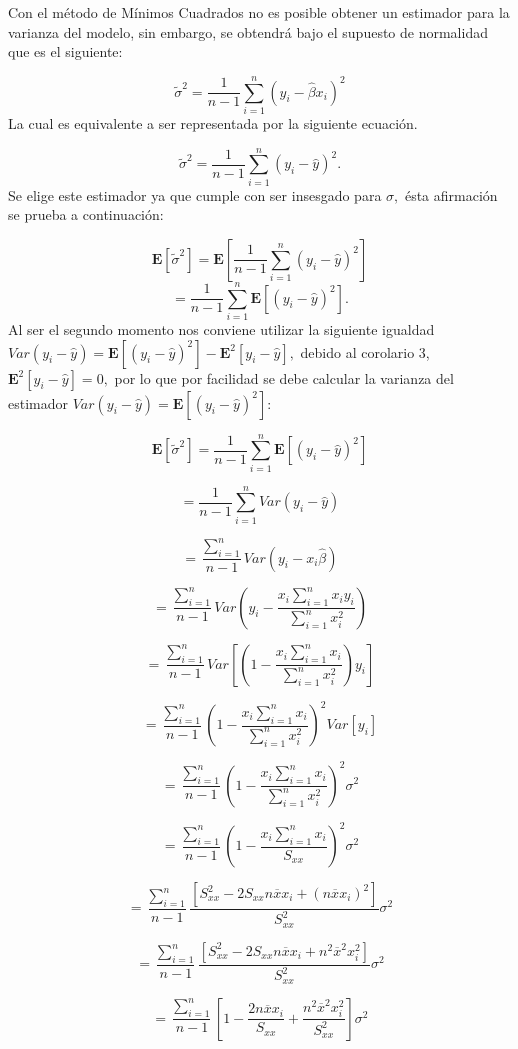 \documentclass[a4paper,oneside,openany]{book}
\begin{document}
Con el método de Mínimos Cuadrados no es posible obtener un estimador
para la varianza del modelo, sin embargo, se obtendrá bajo el supuesto
de normalidad que es el siguiente:

\[\tilde{\sigma}^2=\frac{1}{n-1}\sum_{i=1}^{n}\left(y_{i}-\hat{\beta}x_{i}\right)^2\]
La cual es equivalente a ser representada por la siguiente ecuación.

\[\tilde{\sigma}^2=\frac{1}{n-1}\sum_{i=1}^{n}(y_{i}-\hat{y})^2.\] Se
elige este estimador ya que cumple con ser insesgado para \(\sigma,\)
ésta afirmación se prueba a continuación:

\[\mathbf{E}[\tilde{\sigma}^2]=\mathbf{E}\left[\frac{1}{n-1}\sum_{i=1}^{n}(y_{i}-\hat{y})^2\right]\]
\[=\frac{1}{n-1}\sum_{i=1}^{n}\mathbf{E}\left[(y_{i}-\hat{y})^2\right].\]
Al ser el segundo momento nos conviene utilizar la siguiente igualdad
\(Var(y_{i}-\hat{y})=\mathbf{E}[(y_{i}-\hat{y})^2]-\mathbf{E}^2[y_{i}-\hat{y}],\)
debido al corolario 3, \(\mathbf{E}^2[y_{i}-\hat{y}]=0,\) por lo que por
facilidad se debe calcular la varianza del estimador
\(Var(y_{i}-\hat{y})=\mathbf{E}[(y_{i}-\hat{y})^2]:\)

\[\mathbf{E}[\tilde{\sigma}^2]=\frac{1}{n-1}\sum_{i=1}^{n}\mathbf{E}\left[(y_{i}-\hat{y})^2\right]\]

\[=\frac{1}{n-1}\sum_{i=1}^{n}Var(y_{i}-\hat{y})\]

\[=\frac{\sum_{i=1}^{n}}{n-1}Var(y_{i}-x_{i}\hat{\beta})\]

\[=\frac{\sum_{i=1}^{n}}{n-1}Var\left(y_{i}-\frac{x_{i}\sum_{i=1}^{n}x_{i}y_{i}}{\sum_{i=1}^{n}x_{i}^2}\right)\]

\[=\frac{\sum_{i=1}^{n}}{n-1}Var\left[\left(1-\frac{x_{i}\sum_{i=1}^{n}x_{i}}{\sum_{i=1}^{n}x_{i}^2}\right)y_{i}\right]\]

\[=\frac{\sum_{i=1}^{n}}{n-1}\left(1-\frac{x_{i}\sum_{i=1}^{n}x_{i}}{\sum_{i=1}^{n}x_{i}^2}\right)^2Var[y_{i}]\]

\[=\frac{\sum_{i=1}^{n}}{n-1}\left(1-\frac{x_{i}\sum_{i=1}^{n}x_{i}}{\sum_{i=1}^{n}x_{i}^2}\right)^2\sigma^2\]

\[=\frac{\sum_{i=1}^{n}}{n-1}\left(1-\frac{x_{i}\sum_{i=1}^{n}x_{i}}{S_{xx}}\right)^2\sigma^2\]

\[=\frac{\sum_{i=1}^{n}}{n-1}\frac{[S_{xx}^2-2S_{xx}n\overline{x}x_{i}+(n\overline{x}x_{i})^2]}{S_{xx}^2}\sigma^2\]

\[=\frac{\sum_{i=1}^{n}}{n-1}\frac{[S_{xx}^2-2S_{xx}n\overline{x}x_{i}+n^2\overline{x}^2x_{i}^2]}{S_{xx}^2}\sigma^2\]

\[=\frac{\sum_{i=1}^{n}}{n-1}\left[ 1-\frac{2n\overline{x}x_{i}}{S_{xx}}+\frac{n^2\overline{x}^2x_{i}^2}{S_{xx}^2}\right]\sigma^2\]
\end{document}
